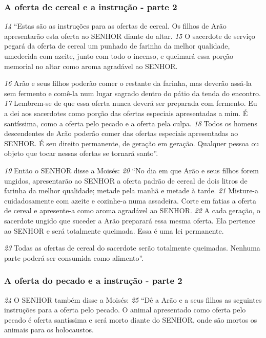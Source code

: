 \bigskip
\subsubsection*{A oferta de cereal e a instrução - parte 2}  
\textit{\tiny 14}
“Estas são as instruções para as ofertas de cereal. Os filhos de Arão
apresentarão esta oferta ao SENHOR diante do altar. 
\textit{\tiny 15}
O sacerdote de serviço
pegará da oferta de cereal um punhado de farinha da melhor qualidade,
umedecida com azeite, junto com todo o incenso, e queimará essa porção
memorial no altar como aroma agradável ao SENHOR. 

\smallskip
\textit{\tiny 16}
Arão e seus filhos poderão
comer o restante da farinha, mas deverão assá-la sem fermento e comê-la num
lugar sagrado dentro do pátio da tenda do encontro. 
\textit{\tiny 17}
Lembrem-se de que essa
oferta nunca deverá ser preparada com fermento. Eu a dei aos sacerdotes como
porção das ofertas especiais apresentadas a mim. É santíssima, como a oferta pelo
pecado e a oferta pela culpa. 
\textit{\tiny 18}
Todos os homens descendentes de Arão poderão
comer das ofertas especiais apresentadas ao SENHOR. É seu direito permanente, de
geração em geração. Qualquer pessoa ou objeto que tocar nessas ofertas se
tornará santo”.

\bigskip
\textit{\tiny 19}
Então o SENHOR disse a Moisés: 
\textit{\tiny 20}
“No dia em que Arão e seus filhos forem
ungidos, apresentarão ao SENHOR a oferta padrão de cereal de dois litros de
farinha da melhor qualidade; metade pela manhã e metade à tarde. 
\textit{\tiny 21}
Misture-a
cuidadosamente com azeite e cozinhe-a numa assadeira. Corte em fatias a oferta
de cereal e apresente-a como aroma agradável ao SENHOR. 
\textit{\tiny 22}
A cada geração, o
sacerdote ungido que suceder a Arão preparará essa mesma oferta. Ela pertence
ao SENHOR e será totalmente queimada. Essa é uma lei permanente. 

\smallskip
\textit{\tiny 23}
Todas as
ofertas de cereal do sacerdote serão totalmente queimadas. Nenhuma parte
poderá ser consumida como alimento”.

\bigskip
\subsubsection*{A oferta do pecado e a instrução - parte 2}  
\textit{\tiny 24}
O SENHOR também disse a Moisés: 
\textit{\tiny 25}
“Dê a Arão e a seus filhos as seguintes
instruções para a oferta pelo pecado. O animal apresentado como oferta pelo
pecado é oferta santíssima e será morto diante do SENHOR, onde são mortos os
animais para os holocaustos. 

